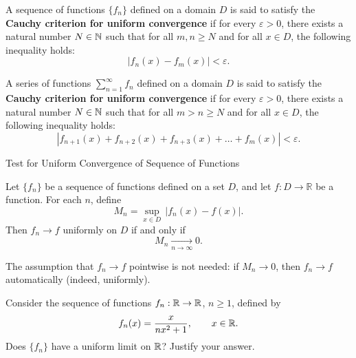 \documentclass[12pt, a4paper]{article}
\begin{document}
\begin{theorem}
    A sequence of functions $\{f_n\}$ defined on a domain $D$ is said to satisfy the \textbf{Cauchy criterion for uniform convergence} if for every $\varepsilon > 0$, there exists a natural number $N \in \mathbb{N}$ such that for all $m, n \geq N$ and for all $x \in D$, the following inequality holds:
    \[
    |f_n(x) - f_m(x)| < \varepsilon.
    \]
\end{theorem}

\clearpage

\begin{theorem}
    A series of functions $\sum_{n=1}^{\infty} f_n$ defined on a domain $D$ is said to satisfy the \textbf{Cauchy criterion for uniform convergence} if for every $\varepsilon > 0$, there exists a natural number $N \in \mathbb{N}$ such that for all $m > n \geq N$ and for all $x \in D$, the following inequality holds:
    \[
    \left|f_{n+1}(x) + f_{n+2}(x) + f_{n+3}(x) + \dots + f_{m}(x)\right| < \varepsilon.
    \]
    
\end{theorem}

\clearpage

\begin{heading}
    Test for Uniform Convergence of Sequence of Functions
\end{heading}

\vspace{10pt}

\begin{theorem}
Let $\{f_n\}$ be a sequence of functions defined on a set $D$, and let $f:D\to\mathbb{R}$
be a function. For each $n$, define
\[
M_n=\sup_{x\in D}\,|f_n(x)-f(x)|.
\]
Then $f_n\to f$ uniformly on $D$ if and only if
\[
M_n \xrightarrow[n\to\infty]{} 0.
\]
\end{theorem}

\begin{problem}[Remark]
The assumption that $f_n\to f$ pointwise is not needed: if $M_n\to 0$, then
$f_n\to f$ automatically (indeed, uniformly).
\end{problem}


\clearpage

\begin{problem}
Consider the sequence of functions $f_n:\mathbb{R}\to\mathbb{R}$, $n\ge 1$, defined by
\[
f_n(x)=\frac{x}{nx^2+1}, \qquad x\in\mathbb{R}.
\]
Does $\{f_n\}$ have a uniform limit on $\mathbb{R}$? Justify your answer.
\end{problem}
\end{document}
